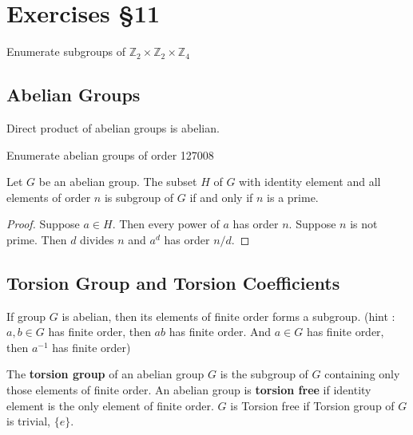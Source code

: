 \section{Exercises \S11}

\begin{question}
	Enumerate subgroups of $\mathbb{Z}_2 \times \mathbb{Z}_2 \times \mathbb{Z}_4$
\end{question}

\subsection{Abelian Groups}
\begin{remark}
Direct product of abelian groups is abelian.%
\end{remark}

\begin{question}
	Enumerate abelian groups of order 127008 
\end{question}

\begin{remark}
	Let $G$ be an abelian group.
	The subset $H$ of $G$ with identity element and all elements of order $n$ is subgroup of $G$ if and only if $n$ is a prime. %
\end{remark}
\begin{proof}
	Suppose $a \in H$.
	Then every power of $a$ has order $n$.
	Suppose $n$ is not prime.
	Then $d$ divides $n$ and $a^d$ has order $n/d$.
\end{proof}

\subsection{Torsion Group and Torsion Coefficients}
\begin{remark}
If group $G$ is abelian, then its elements of finite order forms a subgroup. %
(hint : $a,b \in G$ has finite order, then $ab$ has finite order. And $a \in G$ has finite order, then $a^{-1}$ has finite order)
\end{remark}
\begin{definition} 
	The \textbf{torsion group} of an abelian group $G$ is the subgroup of $G$ containing only those elements of finite order.%
	An abelian group is \textbf{torsion free} if identity element is the only element of finite order.
	$G$ is Torsion free if Torsion group of $G$ is trivial, $\{ e \}$.%
\end{definition}

